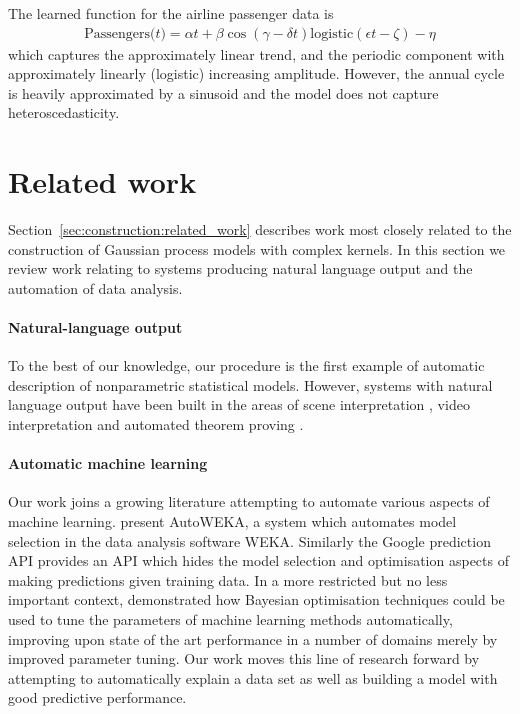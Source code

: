 The learned function for the airline passenger data is
\begin{align*}
\textrm{Passengers($t$)} = \alpha t + \beta\cos(\gamma - \delta t)\textrm{logistic}(\epsilon t - \zeta) - \eta
\end{align*}
which captures the approximately linear trend, and the periodic component with approximately linearly (logistic) increasing amplitude.
However, the annual cycle is heavily approximated by a sinusoid and the model does not capture heteroscedasticity.

\section{Related work}
\label{sec:related-work}

Section~\ref{sec:construction:related_work} describes work most closely related to the construction of Gaussian process models with complex kernels.
In this section we review work relating to systems producing natural language output and the automation of data analysis.

\paragraph{Natural-language output}
To the best of our knowledge, our procedure is the first example of automatic description of nonparametric statistical models.
However, systems with natural language output have been built in the areas of scene interpretation \citep{Karpathy_undated-ww}, video interpretation \citep{Barbu2012-wv} and automated theorem proving \citep{Ganesalingam_undated-us}.

\paragraph{Automatic machine learning}

Our work joins a growing literature attempting to automate various aspects of machine learning.
\citet{Thornton2013-zg} present AutoWEKA, a system which automates model selection in the data analysis software WEKA.
Similarly the Google prediction API \citep{green2011prediction} provides an API which hides the model selection and optimisation aspects of making predictions given training data.
In a more restricted but no less important context, \citet{Snoek2012-ri} demonstrated how Bayesian optimisation techniques could be used to tune the parameters of machine learning methods automatically, improving upon state of the art performance in a number of domains merely by improved parameter tuning.
Our work moves this line of research forward by attempting to automatically explain a data set as well as building a model with good predictive performance.

